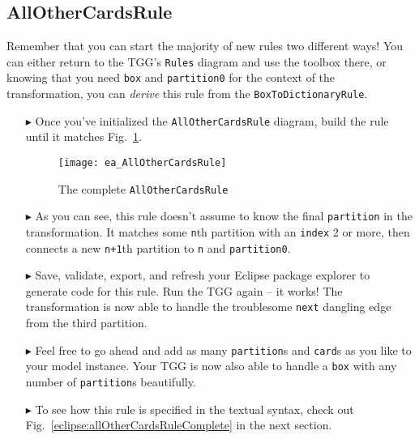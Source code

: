 \newpage
\hypertarget{allCards vis}{}
\subsection{AllOtherCardsRule}
\visHeader

Remember that you can start the majority of new rules two different ways! You can either return to the TGG's \texttt{Rules} diagram and use the toolbox
there, or knowing that you need \texttt{box} and \texttt{partition0} for the context of the transformation, you can \emph{derive} this rule from the
\texttt{BoxToDictionaryRule}.

\begin{itemize}

\item[$\blacktriangleright$] Once you've initialized the \texttt{AllOtherCardsRule} diagram, build the rule until it matches
Fig.~\ref{fig:ea_allOtherCardsRuleComplete}.

\begin{figure}[htbp]
\begin{center}
  \texttt{[image: ea\_AllOtherCardsRule]}
  \caption{The complete \texttt{AllOtherCardsRule}}
  \label{fig:ea_allOtherCardsRuleComplete}
\end{center}
\end{figure}

\item[$\blacktriangleright$] As you can see, this rule doesn't assume to know the final \texttt{partition} in the transformation. It matches some
\texttt{n}th partition with an \texttt{index} 2 or more, then connects a new \texttt{n+1}th partition to \texttt{n} and \texttt{partition0}. 

\item[$\blacktriangleright$] Save, validate, export, and refresh your Eclipse package explorer to generate code for this rule. Run the TGG again -- it works!
The transformation is now able to handle the troublesome \texttt{next} dangling edge from the third partition.

\item[$\blacktriangleright$] Feel free to go ahead and add as many \texttt{partition}s and \texttt{card}s as you like to your model instance. Your TGG is now
also able to handle a \texttt{box} with any number of \texttt{partition}s beautifully. 

\item[$\blacktriangleright$] To see how this rule is specified in the textual syntax, check out Fig.~\ref{eclipse:allOtherCardsRuleComplete} in the next
section.

\end{itemize}
